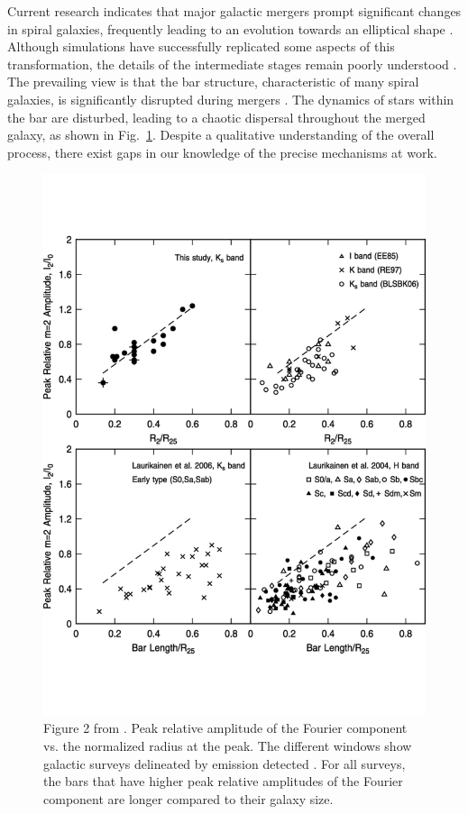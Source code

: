\documentclass[twocolumn]{aastex631}
\DeclareRobustCommand{\Figref}[1]{Fig.~\ref{#1}}
\begin{document}
Current research indicates that major galactic mergers prompt
significant changes in spiral galaxies, frequently leading to an
evolution towards an elliptical shape
\citep[e.g.,][]{mutch:11}. Although simulations have successfully
replicated some aspects of this transformation, the details of the
intermediate stages remain poorly understood \citep{berentzen:03}. The
prevailing view is that the bar structure, characteristic of many
spiral galaxies, is significantly disrupted during mergers
\citep[e.g.,][]{mihos:96,mutch:11}. The dynamics of stars within the
bar are disturbed, leading to a chaotic dispersal throughout the
merged galaxy, as shown in \Figref{fig:elmegreen}. Despite a
qualitative understanding of the overall process, there exist gaps in
our knowledge of the precise mechanisms at work.

\begin{figure}[htbp]
    \centering
    \includegraphics[width=\columnwidth]{elmegreen07}
    \caption{Figure 2 from \citet{elmegreen:07}. Peak relative
      amplitude of the Fourier component vs. the normalized radius at
      the peak. The different windows show galactic surveys delineated
      by emission detected \citep[see][]{elmegreen:07}. For all
      surveys, the bars that have higher peak relative amplitudes of
      the Fourier component are longer compared to their galaxy size.}
    \label{fig:elmegreen}
\end{figure}
\end{document}
